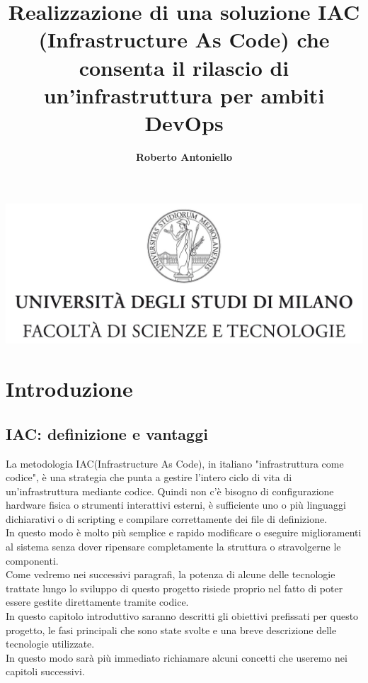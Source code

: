 \documentclass[a4paper,12pt]{report}
\begin{document}
\begin{center}
\includegraphics[width=\textwidth]{Logo.jpg}
\title{Realizzazione di una soluzione IAC (Infrastructure As Code) che consenta il rilascio di un'infrastruttura per ambiti DevOps}
\end{center}
\author{\textbf{Roberto Antoniello}}

\beforepreface

\afterpreface
% 
% 
% 
\chapter{Introduzione}
\section{IAC: definizione e vantaggi}
La metodologia IAC(Infrastructure As Code), in italiano "infrastruttura come codice", è una strategia che punta a gestire l'intero ciclo di vita di un'infrastruttura mediante codice. Quindi non c'è bisogno di configurazione hardware fisica o strumenti interattivi esterni, è sufficiente uno o più linguaggi dichiarativi o di scripting e compilare correttamente dei file di definizione.\cite{iacdef} \\ 
In questo modo è molto più semplice e rapido modificare o eseguire miglioramenti al sistema senza dover ripensare completamente la struttura o stravolgerne le componenti. \\
Come vedremo nei successivi paragrafi, la potenza di alcune delle tecnologie trattate lungo lo sviluppo di questo progetto risiede proprio nel fatto di poter essere gestite direttamente tramite codice.\\
In questo capitolo introduttivo saranno descritti gli obiettivi prefissati per questo progetto, le fasi principali che sono state svolte e una breve descrizione delle tecnologie utilizzate. \\
In questo modo sarà più immediato richiamare alcuni concetti che useremo nei capitoli successivi.
\end{document}
